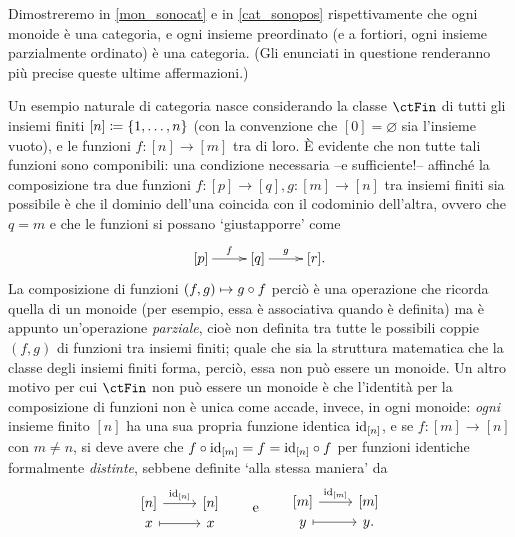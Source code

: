 Dimostreremo in \ref{mon_sonocat} e in \ref{cat_sonopos} rispettivamente che ogni monoide è una categoria, e ogni insieme preordinato (e a fortiori, ogni insieme parzialmente ordinato) è una categoria. (Gli enunciati in questione renderanno più precise queste ultime affermazioni.)
\begin{example}\label{protoex_finset}
	Un esempio naturale di categoria nasce considerando la classe \(\ctFin\) di tutti gli insiemi finiti \([n]\coloneqq \{1,\dots,n\}\) (con la convenzione che \([0]=\varnothing\) sia l'insieme vuoto), e le funzioni \(f : [n] \to [m]\) tra di loro. \`E evidente che non tutte tali funzioni sono componibili: una condizione necessaria --e sufficiente!-- affinché la composizione tra due funzioni \(f : [p] \to [q],g : [m] \to [n]\) tra insiemi finiti sia possibile è che il dominio dell'una coincida con il codominio dell'altra, ovvero che \(q=m\) e che le funzioni si possano `giustapporre' come
	\[\xymatrix{
			[p] \ar[r]^-f & [q] \ar[r]^-g & [r].
		}\]
	La composizione di funzioni \((f,g)\mapsto g\circ f\) perciò è una operazione che ricorda quella di un monoide (per esempio, essa è associativa quando è definita) ma è appunto un'operazione \emph{parziale}, cioè non definita tra tutte le possibili coppie \((f,g)\) di funzioni tra insiemi finiti; quale che sia la struttura matematica che la classe degli insiemi finiti forma, perciò, essa non può essere un monoide. Un altro motivo per cui \(\ctFin\) non può essere un monoide è che l'identità per la composizione di funzioni non è unica come accade, invece, in ogni monoide: \emph{ogni} insieme finito \([n]\) ha una sua propria funzione identica \(\mathrm{id}_{[n]}\), e se \(f : [m]\to [n]\) con \(m\ne n\), si deve avere che \(f\circ \mathrm{id}_{[m]}=f=\mathrm{id}_{[n]}\circ f\) per funzioni identiche formalmente \emph{distinte}, sebbene definite `alla stessa maniera' da
	\[
		\begin{tikzcd}[row sep=0]
			{[n]} \ar{r}{\id_{[n]}} & {[n]} \\
			x \ar[mapsto]{r} & x
		\end{tikzcd}
		\qquad\mbox{e}\qquad
		\begin{tikzcd}[row sep=0]
			{[m]} \ar{r}{\id_{[m]}} & {[m]} \\
			y \ar[mapsto]{r} & y .
		\end{tikzcd}
	\]


\end{example}
